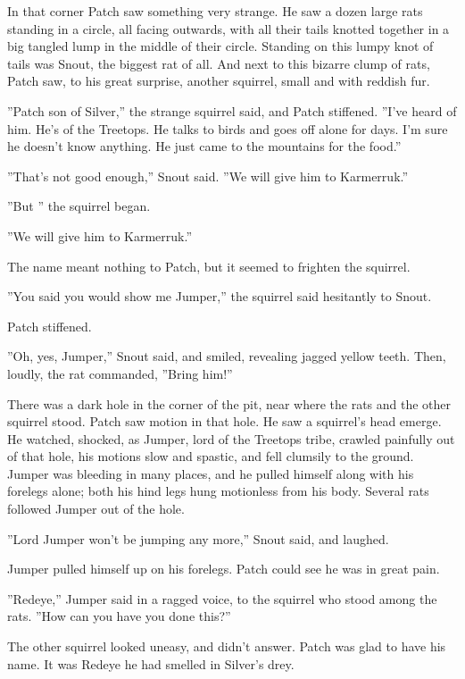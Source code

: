 \documentclass[11pt]{article}
\begin{document}
 In that corner Patch saw something very strange. He saw a dozen large rats standing in a circle, all facing outwards, with all their tails knotted together in a big tangled lump in the middle of their circle. Standing on this lumpy knot of tails was Snout, the biggest rat of all. And next to this bizarre clump of rats, Patch saw, to his great surprise, another squirrel, small and with reddish fur.\par
 ''Patch son of Silver,'' the strange squirrel said, and Patch stiffened. ''I've heard of him. He's of the Treetops. He talks to birds and goes off alone for days. I'm sure he doesn't know anything. He just came to the mountains for the food.''\par
 ''That's not good enough,'' Snout said. ''We will give him to Karmerruk.''\par
 ''But %
'' the squirrel began.\par
 ''We will give him to Karmerruk.''\par
 The name meant nothing to Patch, but it seemed to frighten the squirrel.\par
''You said you would show me Jumper,'' the squirrel said hesitantly to Snout.\par
 Patch stiffened.\par
 ''Oh, yes, Jumper,'' Snout said, and smiled, revealing jagged yellow teeth. Then, loudly, the rat commanded, ''Bring him!''\par
 There was a dark hole in the corner of the pit, near where the rats and the other squirrel stood. Patch saw motion in that hole. He saw a squirrel's head emerge. He watched, shocked, as Jumper, lord of the Treetops tribe, crawled painfully out of that hole, his motions slow and spastic, and fell clumsily to the ground. Jumper was bleeding in many places, and he pulled himself along with his forelegs alone; both his hind legs hung motionless from his body. Several rats followed Jumper out of the hole.\par
 ''Lord Jumper won't be jumping any more,'' Snout said, and laughed.\par
 Jumper pulled himself up on his forelegs. Patch could see he was in great pain.\par
 ''Redeye,'' Jumper said in a ragged voice, to the squirrel who stood among the rats. ''How can you have you done this?''\par
 The other squirrel looked uneasy, and didn't answer. Patch was glad to have his name. It was Redeye he had smelled in Silver's drey.\par
\end{document}
